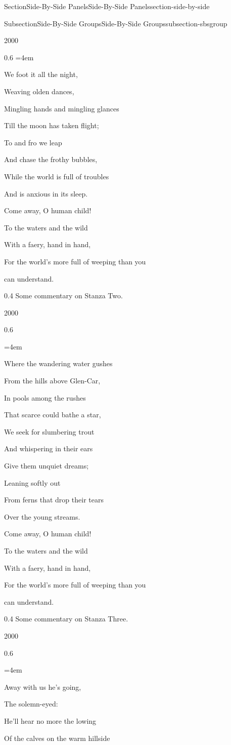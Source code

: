\documentclass[twoside,10pt,]{article}
\numberwithin{equation}{section}
\newenvironment{poem}{\setlength{\parindent}{0em}}{}
\newcommand{\poemTitle}[1]{\begin{center}\large\textbf{#1}\end{center}}
\newenvironment{stanza}{\vspace{0.25 em}\hangindent=4em}{\vspace{1 em}}
\newcommand{\poemlineleft}[1]{{\raggedright{#1}\par}\vspace{-\parskip}}
\begin{document}
\begin{sectionptx}{Section}{Side-By-Side Panels}{}{Side-By-Side Panels}{}{}{section-side-by-side}
\begin{subsectionptx}{Subsection}{Side-By-Side Groups}{}{Side-By-Side Groups}{}{}{subsection-sbsgroup}
\begin{sidebyside}{2}{0}{0}{0}
\begin{sbspanel}{0.6}
\begin{poem}
\begin{stanza}
\poemlineleft{We foot it all the night,}
\poemlineleft{Weaving olden dances,}
\poemlineleft{Mingling hands and mingling glances}
\poemlineleft{Till the moon has taken flight;}
\poemlineleft{To and fro we leap}
\poemlineleft{And chase the frothy bubbles,}
\poemlineleft{While the world is full of troubles}
\poemlineleft{And is anxious in its sleep.}
\poemlineleft{Come away, O human child!}
\poemlineleft{To the waters and the wild}
\poemlineleft{With a faery, hand in hand,}
\poemlineleft{For the world's more full of weeping than you}
\poemlineleft{can understand.}
\end{stanza}
\end{poem}
\end{sbspanel}%
\begin{sbspanel}{0.4}%
Some commentary on Stanza Two.%
\end{sbspanel}%
\end{sidebyside}%
\begin{sidebyside}{2}{0}{0}{0}%
\begin{sbspanel}{0.6}%
\begin{poem}%
\poemTitle{}
\begin{stanza}
\poemlineleft{Where the wandering water gushes}
\poemlineleft{From the hills above Glen-Car,}
\poemlineleft{In pools among the rushes}
\poemlineleft{That scarce could bathe a star,}
\poemlineleft{We seek for slumbering trout}
\poemlineleft{And whispering in their ears}
\poemlineleft{Give them unquiet dreams;}
\poemlineleft{Leaning softly out}
\poemlineleft{From ferns that drop their tears}
\poemlineleft{Over the young streams.}
\poemlineleft{Come away, O human child!}
\poemlineleft{To the waters and the wild}
\poemlineleft{With a faery, hand in hand,}
\poemlineleft{For the world's more full of weeping than you}
\poemlineleft{can understand.}
\end{stanza}
\end{poem}
\end{sbspanel}%
\begin{sbspanel}{0.4}%
Some commentary on Stanza Three.%
\end{sbspanel}%
\end{sidebyside}%
\begin{sidebyside}{2}{0}{0}{0}%
\begin{sbspanel}{0.6}%
\begin{poem}%
\poemTitle{}
\begin{stanza}
\poemlineleft{Away with us he's going,}
\poemlineleft{The solemn-eyed:}
\poemlineleft{He'll hear no more the lowing}
\poemlineleft{Of the calves on the warm hillside}

\end{stanza}
\end{poem}
\end{sbspanel}
\end{sidebyside}
\end{subsectionptx}
\end{sectionptx}
\end{document}
